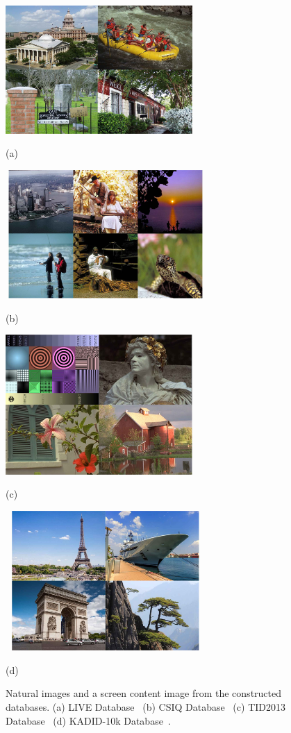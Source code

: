 	\begin{figure}[!h]
		\centering
		\begin{minipage}[t]{.49\linewidth}
			\centering
			\includegraphics[width=2.8in]{fig/LIVE.jpg}
			\centerline{(a)}
		\end{minipage}
		\begin{minipage}[t]{.49\linewidth}
			\centering
			\includegraphics[width=3in, height=1.93in]{fig/CSIQ.jpg}
			\centerline{(b)}
		\end{minipage}
		\begin{minipage}[t]{.49\linewidth}
			\centering
			\includegraphics[width=2.8in]{fig/TID2013.jpg}
			\centerline{(c)}
		\end{minipage}
		\begin{minipage}[t]{.49\linewidth}
			\centering
			\includegraphics[width=3in, height=2.1in]{fig/KADID.jpg}
			\centerline{(d)}
		\end{minipage}
		\caption{Natural images and a screen content image from the constructed databases. (a) LIVE Database~\citep{livedataset} (b) CSIQ Database~\citep{larson2010most} (c) TID2013 Database~\citep{ponomarenko2015image} (d) KADID-10k Database~\citep{kadid10k}.}
		\label{Databases}
	\end{figure}
	
